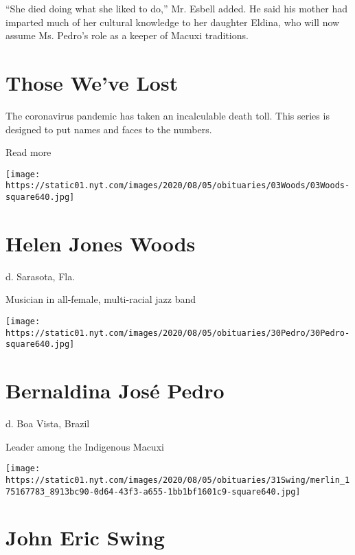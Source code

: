 ``She died doing what she liked to do,'' Mr. Esbell added. He said his
mother had imparted much of her cultural knowledge to her daughter
Eldina, who will now assume Ms. Pedro's role as a keeper of Macuxi
traditions.

\href{https://www.nytimes.com/interactive/2020/obituaries/people-died-coronavirus-obituaries.html?action=click\&pgtype=Article\&state=default\&region=BELOW_MAIN_CONTENT\&context=covid_obits_promo}{}

\hypertarget{those-weve-lost}{%
\section{Those We've Lost}\label{those-weve-lost}}

The coronavirus pandemic has taken an incalculable death toll. This
series is designed to put names and faces to the numbers.

Read more

\texttt{[image: https://static01.nyt.com/images/2020/08/05/obituaries/03Woods/03Woods-square640.jpg]}

\hypertarget{helen-jones-woods}{%
\section{Helen Jones Woods}\label{helen-jones-woods}}

d. Sarasota, Fla.

Musician in all-female, multi-racial jazz band

\texttt{[image: https://static01.nyt.com/images/2020/08/05/obituaries/30Pedro/30Pedro-square640.jpg]}

\hypertarget{bernaldina-josuxe9-pedro}{%
\section{Bernaldina José Pedro}\label{bernaldina-josuxe9-pedro}}

d. Boa Vista, Brazil

Leader among the Indigenous Macuxi

\texttt{[image: https://static01.nyt.com/images/2020/08/05/obituaries/31Swing/merlin\_175167783\_8913bc90-0d64-43f3-a655-1bb1bf1601c9-square640.jpg]}

\hypertarget{john-eric-swing}{%
\section{John Eric Swing}\label{john-eric-swing}}

